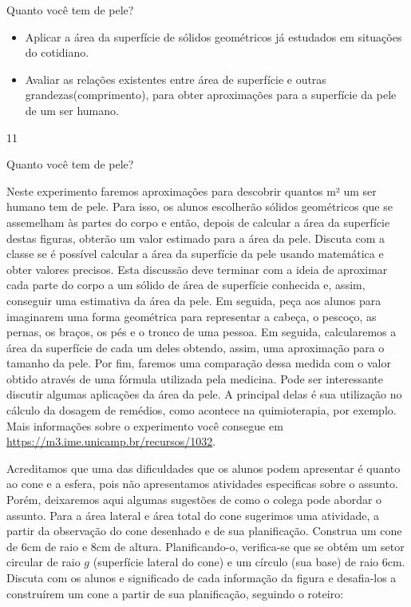\begin{objectives}{Quanto você tem de pele?}
{
\begin{itemize}
\item Aplicar a área da superfície de sólidos geométricos já estudados em situações do cotidiano.
\item Avaliar as relações existentes entre área de superfície e outras grandezas(comprimento), para obter aproximações para a superfície da pele de um ser humano.
\end{itemize}
}{1}{1}
\end{objectives}
\begin{sugestions}{Quanto você tem de pele?}
{

Neste experimento faremos aproximações para descobrir quantos m² um ser humano tem de pele. Para isso, os alunos escolherão sólidos geométricos que se assemelham às partes do corpo e então, depois de calcular a área da superfície destas figuras, obterão um valor estimado para a área da pele. Discuta com a classe se é possível calcular a área da superfície da pele usando matemática e obter valores precisos. Esta discussão deve terminar com a ideia de aproximar cada parte do corpo a um sólido de área de superfície conhecida e, assim, conseguir uma estimativa da área da pele. Em seguida, peça aos alunos para imaginarem uma forma geométrica para representar a cabeça, o pescoço, as pernas, os braços, os pés e o tronco de uma pessoa. Em seguida, calcularemos a área da superfície de cada um deles obtendo, assim, uma aproximação para o tamanho da pele. Por fim, faremos uma comparação dessa medida com o valor obtido através de uma fórmula utilizada pela medicina. Pode ser interessante discutir algumas aplicações da área da pele. A principal delas é sua utilização no cálculo da dosagem de remédios, como acontece na quimioterapia, por exemplo. Mais informações sobre o experimento você consegue em \url{https://m3.ime.unicamp.br/recursos/1032}.

Acreditamos que uma das dificuldades que os alunos podem apresentar é quanto ao cone e a esfera, pois não apresentamos atividades especificas sobre o assunto. Porém, deixaremos aqui algumas sugestões de como o colega pode abordar o assunto. Para a área lateral e área total do cone sugerimos uma atividade, a partir da observação do cone desenhado e de sua planificação. Construa um cone de $6$cm de raio e $8$cm de altura. Planificando-o, verifica-se que se obtém um setor circular de raio $g$ (superfície lateral do cone) e um círculo (sua base) de raio $6$cm. Discuta com os alunos e significado de cada informação da figura e desafia-los a construírem um cone a partir de sua planificação, seguindo o roteiro:

}
\end{sugestions}
